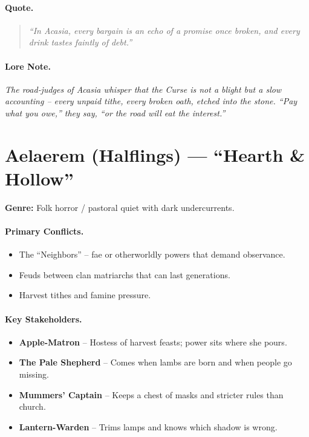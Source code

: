 \paragraph{Quote.}
\begin{quote}
\emph{“In Acasia, every bargain is an echo of a promise once broken, and every drink tastes faintly of debt.”}
\end{quote}

\paragraph{Lore Note.}
\emph{The road‑judges of Acasia whisper that the Curse is not a blight but a slow accounting – every unpaid tithe, every broken oath, etched into the stone. “Pay what you owe,” they say, “or the road will eat the interest.”}

\section{Aelaerem (Halflings) — “Hearth \& Hollow”}
\textbf{Genre:} Folk horror / pastoral quiet with dark undercurrents.

\paragraph{Primary Conflicts.}
\begin{itemize}
  \item The “Neighbors” – fae or otherworldly powers that demand observance.
  \item Feuds between clan matriarchs that can last generations.
  \item Harvest tithes and famine pressure.
\end{itemize}

\paragraph{Key Stakeholders.}
\begin{itemize}
  \item \textbf{Apple-Matron} – Hostess of harvest feasts; power sits where she pours.
  \item \textbf{The Pale Shepherd} – Comes when lambs are born and when people go missing.
  \item \textbf{Mummers’ Captain} – Keeps a chest of masks and stricter rules than church.
  \item \textbf{Lantern-Warden} – Trims lamps and knows which shadow is wrong.
\end{itemize}

